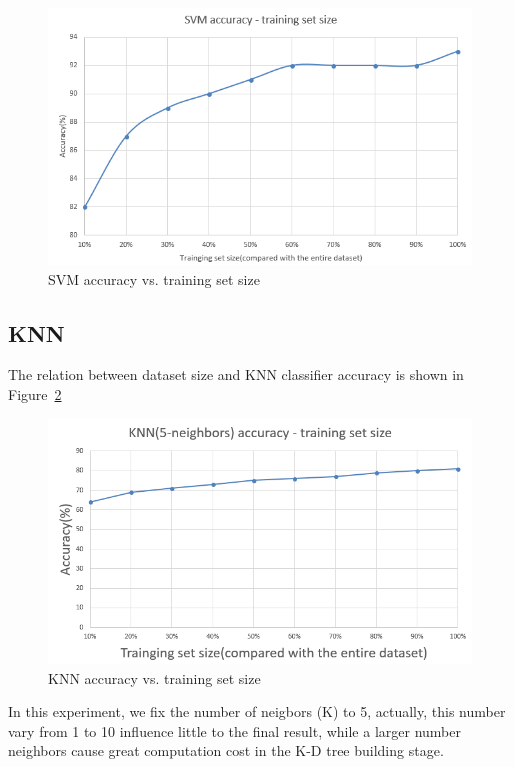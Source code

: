 \documentclass{article}
\begin{document}
\begin{figure}[!h]
\centering
\includegraphics[width=6.0in]{image/svm_curve}
\caption{SVM accuracy vs. training set size }
\label{svm_curve}
\end{figure}

\subsection{KNN}

The relation between dataset size and KNN classifier accuracy is shown in Figure~\ref{KNN_curve}

\begin{figure}[!h]
\centering
\includegraphics[width=6.0in]{image/KNN_curve}
\caption{KNN accuracy vs. training set size }
\label{KNN_curve}
\end{figure}

In this experiment, we fix the number of neigbors (K) to 5, actually, this number vary from 1 to 10 influence little to the final result, while a larger number neighbors cause great computation cost in the K-D tree building stage.
\end{document}
